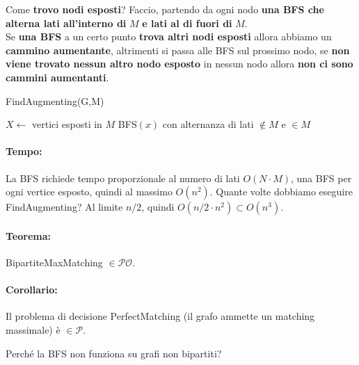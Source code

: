 Come \textbf{trovo nodi esposti}? Faccio, partendo da ogni nodo \textbf{una BFS che alterna lati all'interno di} $M$ \textbf{e lati al di fuori di} $M$.\\

Se \textbf{una BFS} a un certo punto \textbf{trova altri nodi esposti} allora abbiamo un \textbf{cammino aumentante}, altrimenti si passa alle BFS sul prossimo nodo, se \textbf{non viene trovato nessun altro nodo esposto} in nessun nodo allora \textbf{non ci sono cammini aumentanti}.\\

\begin{algorithm}
	\caption{FindAugmenting(G,M)}
	\begin{algorithmic}
		\STATE $X \leftarrow$ vertici esposti in $M$
			\STATE  BFS$(x)$ con alternanza di lati $\notin M$ e $\in M$
		\ENDFOR
	\end{algorithmic}
\end{algorithm}

\paragraph{Tempo:} La BFS richiede tempo proporzionale al numero di lati $O(N \cdot M)$, una BFS per ogni vertice esposto, quindi al massimo $O(n^2)$. Quante volte dobbiamo eseguire FindAugmenting? Al limite $n/2$, quindi $O(n/2 \cdot n^2) \subset O(n^3)$.\\

\paragraph{Teorema:} BipartiteMaxMatching $\in \mathcal{PO}$.\\

\paragraph{Corollario:} Il problema di decisione PerfectMatching (il grafo ammette un matching massimale) è $\in \mathcal{P}$.\\

\newpage

Perché la BFS non funziona su grafi non bipartiti?

